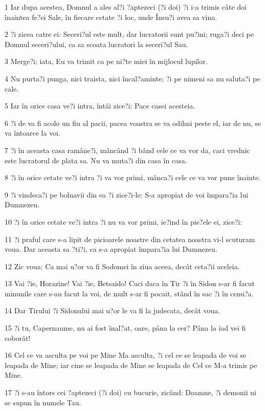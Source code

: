 \par 1 Iar dupa acestea, Domnul a ales al?i ?aptezeci (?i doi) ?i i-a trimis câte doi înaintea fe?ei Sale, în fiecare cetate ?i loc, unde Însu?i avea sa vina.
\par 2 ?i zicea catre ei: Seceri?ul este mult, dar lucratorii sunt pu?ini; ruga?i deci pe Domnul seceri?ului, ca sa scoata lucratori la seceri?ul Sau.
\par 3 Merge?i; iata, Eu va trimit ca pe ni?te miei în mijlocul lupilor.
\par 4 Nu purta?i punga, nici traista, nici încal?aminte; ?i pe nimeni sa nu saluta?i pe cale.
\par 5 Iar în orice casa ve?i intra, întâi zice?i: Pace casei acesteia.
\par 6 ?i de va fi acolo un fiu al pacii, pacea voastra se va odihni peste el, iar de nu, se va întoarce la voi.
\par 7 ?i în aceasta casa ramâne?i, mâncând ?i bând cele ce va vor da, caci vrednic este lucratorul de plata sa. Nu va muta?i din casa în casa.
\par 8 ?i în orice cetate ve?i intra ?i va vor primi, mânca?i cele ce va vor pune înainte.
\par 9 ?i vindeca?i pe bolnavii din ea ?i zice?i-le: S-a apropiat de voi împara?ia lui Dumnezeu.
\par 10 ?i în orice cetate ve?i intra ?i nu va vor primi, ie?ind în pie?ele ei, zice?i:
\par 11 ?i praful care s-a lipit de picioarele noastre din cetatea noastra vi-l scuturam voua. Dar aceasta sa ?ti?i, ca s-a apropiat împara?ia lui Dumnezeu.
\par 12 Zic voua: Ca mai u?or va fi Sodomei în ziua aceea, decât ceta?ii aceleia.
\par 13 Vai ?ie, Horazine! Vai ?ie, Betsaido! Caci daca în Tir ?i în Sidon s-ar fi facut minunile care s-au facut la voi, de mult s-ar fi pocait, stând în sac ?i în cenu?a.
\par 14 Dar Tirului ?i Sidonului mai u?or le va fi la judecata, decât voua.
\par 15 ?i tu, Capernaume, nu ai fost înal?at, oare, pâna la cer? Pâna la iad vei fi coborât!
\par 16 Cel ce va asculta pe voi pe Mine Ma asculta, ?i cel ce se leapada de voi se leapada de Mine; iar cine se leapada de Mine se leapada de Cel ce M-a trimis pe Mine.
\par 17 ?i s-au întors cei ?aptezeci (?i doi) cu bucurie, zicând: Doamne, ?i demonii ni se supun în numele Tau.

